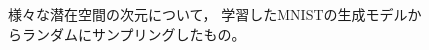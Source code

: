 \documentclass[dvipdfmx, fleqn, draft]{jsarticle}
\begin{document}
\begin{figure}
\begin{minipage}{0.2\linewidth}
        \label{fig:latent_space_20D}
    \end{minipage}
    \caption{
        様々な潜在空間の次元について，
        学習したMNISTの生成モデルからランダムにサンプリングしたもの。
        }
    \label{fig:latent_spaces}
\end{figure}
\end{document}
